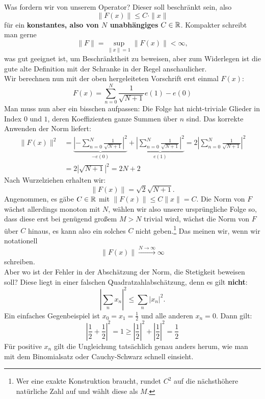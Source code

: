 Was fordern wir von unserem Operator? Dieser soll beschränkt sein, also \[ \|F(x)\| \leq C \cdot \|x\|\] für ein \textbf{konstantes, also von $N$ unabhängiges} $C \in \mathbb{R}$. Kompakter schreibt man gerne \[\|F\| = \sup_{\|x\|=1} \|F(x)\| < \infty,\] was gut geeignet ist, um Beschränktheit zu beweisen, aber zum Widerlegen ist die gute alte Definition mit der Schranke in der Regel anschaulicher.\\
Wir berechnen nun mit der oben hergeleiteten Vorschrift erst einmal $F(x)$:
\[ F(x) = \sum_{n=0}^N \frac{1}{\sqrt{N+1}} e(1)-e(0)\]
Man muss nun aber ein bisschen aufpassen: Die Folge hat nicht-triviale Glieder in Index $0$ und $1$, deren Koeffizienten ganze Summen über $n$ sind. Das korrekte Anwenden der Norm liefert:
\begin{align*}
\|F(x)\|^2 &= \underbrace{\left| -\sum_{n=0}^N \frac{1}{\sqrt{N+1}}\right|^2}_{-e(0)} + \underbrace{\left| \sum_{n=0}^N \frac{1}{\sqrt{N+1}}\right|^2}_{e(1)} = 2 \left| \sum_{n=0}^N \frac{1}{\sqrt{N+1}}\right|^2\\
&=2 \left| \sqrt{N+1}\right|^2 = 2N+2
\end{align*}
Nach Wurzelziehen erhalten wir:
\[\|F(x)\| = \sqrt{2} \sqrt{N+1}.\]
Angenommen, es gäbe $C \in \mathbb{R}$ mit $\|F(x)\| \leq C \|x\| = C$. Die Norm von $F$ wächst allerdings monoton mit $N$, wählen wir also unsere ursprüngliche Folge so, dass diese erst bei genügend großem $M> N$ trivial wird, wächst die Norm von $F$ über $C$ hinaus, es kann also ein solches $C$ nicht geben.\footnote{Wer eine exakte Konstruktion braucht, rundet $C^2$ auf die nächsthöhere natürliche Zahl auf und wählt diese als $M$.} Das meinen wir, wenn wir notationell
\[
\|F(x)\| \overset{N \to \infty}\to \infty
\]
schreiben.\\
Aber wo ist der Fehler in der Abschätzung der Norm, die Stetigkeit beweisen soll? Diese liegt in einer falschen Quadratzahlabschätzung, denn es gilt \textbf{nicht}:
\[\left| \sum_{n} x_n \right|^2 \leq \sum_n |x_n|^2. \]
Ein einfaches Gegenbeispiel ist $x_0=x_1=\frac{1}{2}$ und alle anderen $x_n =0$. Dann gilt:
\[ \left| \frac{1}{2}+ \frac{1}{2} \right|^2 = 1 \geq \left| \frac{1}{2} \right|^2 + \left| \frac{1}{2} \right|^2 = \frac{1}{2} \]
Für positive $x_n$ gilt die Ungleichung tatsächlich genau anders herum, wie man mit dem Binomialsatz oder Cauchy-Schwarz schnell einsieht.